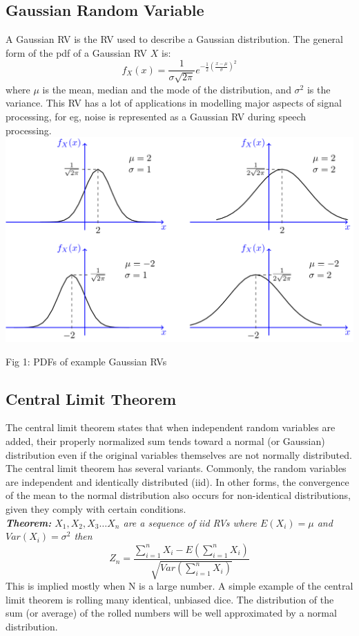 \documentclass[10pt,twocolumn,letterpaper]{article}
\begin{document}


\subsection{Gaussian Random Variable}
A Gaussian RV is the RV used to describe a Gaussian distribution. The general form of the pdf of a Gaussian RV $X$ is: $$f_X(x) = \frac{1}{\sigma\sqrt{2\pi}}e^{-\frac{1}{2}(\frac{x-\mu}{\sigma})^2}$$ where $\mu$ is the mean, median and the mode of the distribution, and $\sigma^2$ is the variance. This RV has a lot of applications in modelling major aspects of signal processing, for eg, noise is represented as a Gaussian RV during speech processing.\\
\vspace{0.7cm}
\includegraphics[scale=0.57]{gauss.png}
\begin{center}
    Fig 1: PDFs of example Gaussian RVs
\end{center}




\subsection{Central Limit Theorem}
The central limit theorem states that when independent random variables are added, their properly normalized sum tends toward a normal (or Gaussian) distribution even if the original variables themselves are not normally distributed. The central limit theorem has several variants. Commonly, the random variables are independent and identically distributed (iid). In other forms, the convergence of the mean to the normal distribution also occurs for non-identical distributions, given they comply with certain conditions. \\
\textit{\textbf{Theorem:} $X_1,X_2,X_3 \dots X_n$ are a sequence of iid RVs where $E(X_i) = \mu$ and $Var(X_i)=\sigma ^2$ then}
$$ Z_n = \frac{\sum_{i=1}^{n}X_i - E\left(\sum_{i=1}^{n}X_i\right)}{\sqrt{Var(\sum_{i=1}^nX_i)}} $$
This is implied mostly when N is a large number. A simple example of the central limit theorem is rolling many identical, unbiased dice. The distribution of the sum (or average) of the rolled numbers will be well approximated by a normal distribution.
\end{document}
